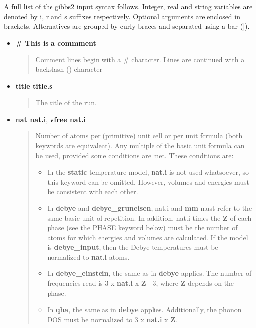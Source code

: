 \documentclass[a4paper]{article}
\begin{document}
A full list of the gibbs2 input syntax follows. Integer, real and
string variables are denoted by i, r and s suffixes
respectively. Optional arguments are enclosed in
brackets. Alternatives are grouped by curly braces and separated using
a bar (|).
%
\begin{itemize}

\item \textbf{\# This is a commment}
%
\begin{quote}

Comment lines begin with a \# character. Lines are continued with a
backslash () character

\end{quote}

\item \textbf{title title.s}
%
\begin{quote}

The title of the run.

\end{quote}

\item \textbf{nat nat.i}, \textbf{vfree nat.i}
%
\begin{quote}

Number of atoms per (primitive) unit cell or per unit formula (both
keywords are equivalent). Any multiple of the basic unit formula
can be used, provided some conditions are met. These conditions
are:
%
\begin{itemize}

\item In the \textbf{static} temperature model, \textbf{nat.i} is not used
whatsoever, so this keyword can be omitted. However, volumes and
energies must be consistent with each other.

\item In \textbf{debye} and \textbf{debye\_gruneisen}, nat.i and \textbf{mm} must
refer to the same basic unit of repetition. In addition,
nat.i times the \textbf{Z} of each phase (see the PHASE keyword
below) must be the number of atoms for which energies and volumes
are calculated. If the model is \textbf{debye\_input}, then the Debye
temperatures must be normalized to \textbf{nat.i} atoms.

\item In \textbf{debye\_einstein}, the same as in \textbf{debye} applies. The
number of frequencies read is 3 x \textbf{nat.i} x \textbf{Z} - 3, where
\textbf{Z} depends on the phase.

\item In \textbf{qha}, the same as in \textbf{debye} applies. Additionally, the
phonon DOS must be normalized to 3 x \textbf{nat.i} x \textbf{Z}.


\end{itemize}
\end{quote}
\end{itemize}
\end{document}
